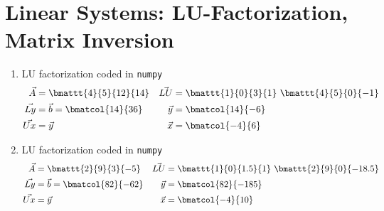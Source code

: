\section{Linear Systems: LU-Factorization, Matrix Inversion}

\begin{enumerate}
    \item LU factorization coded in \texttt{numpy}
          \begin{align}
              \vec{A}  & = \bmattt{4}{5}{12}{14}                     &
              \vec{LU} & = \bmattt{1}{0}{3}{1}\ \bmattt{4}{5}{0}{-1}   \\
              \vec{Ly} & = \vec{b} = \bmatcol{14}{36}                &
              \vec{y}  & = \bmatcol{14}{-6}                            \\
              \vec{Ux} & = \vec{y}                                   &
              \vec{x}  & = \bmatcol{-4}{6}
          \end{align}

    \item LU factorization coded in \texttt{numpy}
          \begin{align}
              \vec{A}  & = \bmattt{2}{9}{3}{-5}                           &
              \vec{LU} & = \bmattt{1}{0}{1.5}{1}\ \bmattt{2}{9}{0}{-18.5}   \\
              \vec{Ly} & = \vec{b} = \bmatcol{82}{-62}                    &
              \vec{y}  & = \bmatcol{82}{-185}                               \\
              \vec{Ux} & = \vec{y}                                        &
              \vec{x}  & = \bmatcol{-4}{10}
          \end{align}


\end{enumerate}
